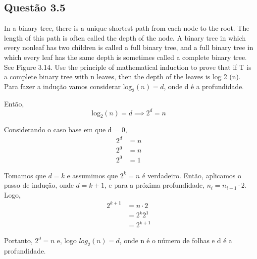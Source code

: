 

\subsection{Questão 3.5}

In a binary tree, there is a unique shortest path from each node to the root. The length of this path is often called the depth of the node. A binary tree in which every nonleaf has two children is called a full binary tree, and a full binary tree in which every leaf has the same depth is sometimes called a complete binary tree. See Figure 3.14. Use the principle of mathematical induction to prove that if T is a complete binary tree with n leaves, then the depth of the leaves is log 2 (n).\\

Para fazer a indução vamos considerar $\mathrm{log}_2(n) = d$, onde d é a profundidade.

Então,
\begin{equation}
  \mathrm{log}_2(n) = d \implies 2^{d} = n
\end{equation}

Considerando o caso base em que d = 0,
\begin{equation} \label{eq1}
\begin{split}
2^d & = n \\
2^0 & = n \\
2^0 & = 1
\end{split}
\end{equation}

Tomamos que $d = k$ e assumimos que $2^k = n$ é verdadeiro. Então, aplicamos o passo de indução, onde $d = k + 1$, e para a próxima profundidade, $n_{i} = n_{i - 1}\cdot2$. Logo,
\begin{equation}
\begin{split}
2^{k+1} & = n\cdot 2 \\
        & = 2^{k} 2^{1} \\
        & = 2^{k+1}
\end{split}
\end{equation}

Portanto, $2^{d} = n$ e, logo $log_{2}(n) = d$, onde n é o número de folhas e d é a profundidade.

